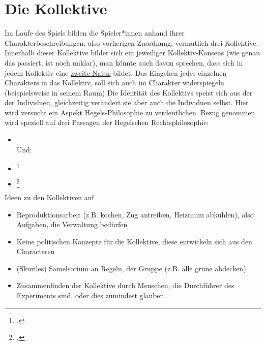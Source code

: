 \documentclass[12pt, a4paper, openany]{report}
\begin{document}
\section{Die Kollektive}
Im Laufe des Spiels bilden die Spieler*innen anhand ihrer Charakterbeschreibungen, also vorherigen Zuordnung, vermutlich drei Kollektive. 
Innerhalb dieser Kollektive bildet sich ein jeweiliger Kollektiv-Konsens (wie genau das passiert, ist noch unklar), man könnte auch davon sprechen, dass sich in jedem Kollektiv eine \hyperref[zweite-natur]{\glqq zweite Natur\grqq{}} bildet. 
Das Eingehen jedes einzelnen Charakters in das Kollektiv, soll sich auch im Charakter widerspiegeln (beispielsweise in seinem Raum) 
Die Identität des Kollektivs speist sich aus der der Individuen, gleichzeitig verändert sie aber auch die Individuen selbst. 
Hier wird versucht ein Aspekt Hegels-Philosophie zu verdeutlichen. 
Bezug genommen wird speziell auf drei Passagen der Hegelschen Rechtsphilosophie: \\

\begin{itemize}
    \item[]  \\
Und:\\
    \item[] \footcite[][§ 147, S. 162]{hegel_grundlinien_2017} \\
    \item[] \footcite[][§151, S. 166]{hegel_grundlinien_2017}
\end{itemize}

Ideen zu den Kollektiven auf
\begin{itemize}
\item Reproduktionsarbeit (z.B. kochen, Zug antreiben, Heizraum abkühlen), also Aufgaben, die Verwaltung bedürfen
\item Keine politischen Konzepte für die Kollektive, diese entwickeln sich aus den Characteren 
\item (Skuriles) Samelsorium an Regeln, der Gruppe (z.B. alle grüne abdecken)
\item Zusammenfinden der Kollektive durch Menschen, die Durchführer des Experiments sind, oder dies zumindest glauben.
\end{itemize}
\end{document}
